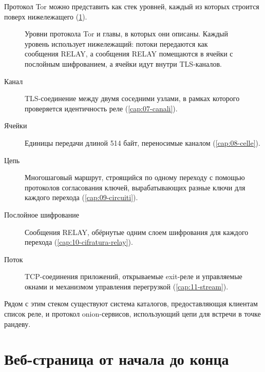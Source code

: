 Протокол Tor можно представить как стек уровней, каждый из которых строится поверх нижележащего (\cref{fig:arch-livelli}).

\begin{figure}[htbp]
\centering

\caption{Уровни протокола Tor и главы, в которых они описаны. Каждый уровень использует нижележащий: потоки передаются как сообщения RELAY, а сообщения RELAY помещаются в ячейки с послойным шифрованием, а ячейки идут внутри TLS-каналов.}
\label{fig:arch-livelli}
\end{figure}

\begin{description}
  \item[Канал] TLS-соединение между двумя соседними узлами, в рамках которого проверяется идентичность реле (\cref{cap:07-canali}).
  \item[Ячейки] Единицы передачи длиной 514 байт, переносимые каналом (\cref{cap:08-celle}).
  \item[Цепь] Многошаговый маршрут, строящийся по одному переходу с помощью протоколов согласования ключей, вырабатывающих разные ключи для каждого перехода (\cref{cap:09-circuiti}).
  \item[Послойное шифрование] Сообщения RELAY, обёрнутые одним слоем шифрования для каждого перехода (\cref{cap:10-cifratura-relay}).
  \item[Поток] TCP-соединения приложений, открываемые exit-реле и управляемые окнами и механизмом управления перегрузкой (\cref{cap:11-stream}).
\end{description}
Рядом с этим стеком существуют система каталогов, предоставляющая клиентам список реле, и протокол onion-сервисов, использующий цепи для встречи в точке рандеву.

\section{Веб-страница от начала до конца}\label{sec:arch-percorso}

